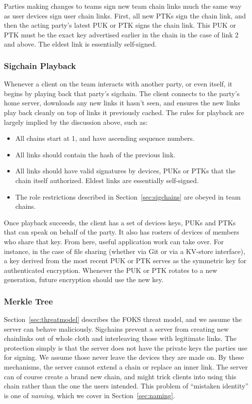 Parties making changes to teams sign new team chain links much the same way as user devices
sign user chain links. First, all new PTKs sign the chain link, and then the acting
party's latest PUK or PTK signs the chain link. This PUK or PTK must be the exact key
advertised earlier in the chain in the case of link 2 and above. The eldest link
is essentially self-signed.

\subsubsection{Sigchain Playback}

Whenever a client on the team interacts with another party, or even itself, it
begins by playing back that party's sigchain. The client connects to the party's home
server, downloads any new links it hasn't seen, and ensures the new links play back
cleanly on top of links it previously cached. The rules for playback are largely
implied by the discussion above, such as:

\begin{itemize}\itemsep0em
    \item All chains start at 1, and have ascending sequence numbers.
    \item All links should contain the hash of the previous link.
    \item All links should have valid signatures by devices, PUKs or PTKs that the chain 
      itself authorized. Eldest links are essentially self-signed.
    \item The role restrictions described in Section~\ref{sec:sigchains} are obeyed in team chains.
\end{itemize}

Once playback succeeds, the client has a set of devices keys, PUKs and PTKs that can
speak on behalf of the party. It also has rosters of devices of members who share that
key. From here, useful application work can take over. For instance, in the case
of file sharing (whether via Git or via a KV-store interface), a key derived from the
most recent PUK or PTK serves as the symmetric key for authenticated encryption. 
Whenever the PUK or PTK rotates to a new generation, future encryption should use the
new key.

\subsubsection{Merkle Tree}
\label{sec:merkle}

Section~\ref{sec:threatmodel} describes the FOKS threat model, and we assume the
server can behave maliciously.  Sigchains prevent a server from creating new
chainlinks out of whole cloth and interleaving those with legitimate links. The
protection simply is that the server does not have the private keys the parties
use for signing. We assume those never leave the devices they are made on. By these 
mechanisms, the server cannot extend a chain or replace an inner link. The server can
of course create a brand new chain, and might trick clients into using this chain
rather than the one the users intended. This problem of ``mistaken identity'' is one
of \textit{naming}, which we cover in Section~\ref{sec:naming}.

